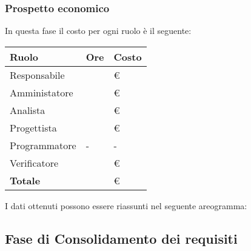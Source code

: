 \subsubsection{Prospetto economico}
In questa fase il costo per ogni ruolo è il seguente:

\begin{center}
	\begin{longtable}{|p{}|p{}|p{}|}
		\hline
		\rowcolor{lighter-grayer}
		\centering\textbf{Ruolo} & \centering\textbf{Ore} & \textbf{Costo} \\
		\hline
		\endfirsthead
		
		\centering Responsabile & \centering & \euro\\
		\hline
		\centering Amministatore & \centering & \euro\\
		\hline
		\centering Analista & \centering & \euro\\
		\hline
		\centering Progettista & \centering & \euro\\
		\hline
		\centering Programmatore & \centering - & - \\
		\hline
		\centering Verificatore & \centering & \euro\\
		\hline
		\centering\textbf{Totale} & \centering & \euro\\
		\hline
	\end{longtable}
\end{center}
I dati ottenuti possono essere riassunti nel seguente areogramma:
\\


	
\subsection{Fase di Consolidamento dei requisiti}

